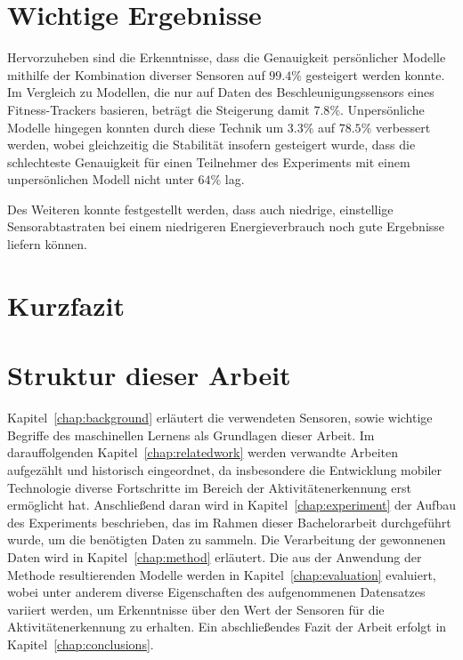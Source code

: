 \section{Wichtige Ergebnisse}
Hervorzuheben sind die Erkenntnisse, dass die Genauigkeit persönlicher Modelle mithilfe der Kombination diverser Sensoren auf $99.4 \%$ gesteigert werden konnte. Im Vergleich zu Modellen, die nur auf Daten des Beschleunigungssensors eines Fitness-Trackers basieren, beträgt die Steigerung damit $7.8 \%$. Unpersönliche Modelle hingegen konnten durch diese Technik um $3.3 \%$ auf $78.5 \%$ verbessert werden, wobei gleichzeitig die Stabilität insofern gesteigert wurde, dass die schlechteste Genauigkeit für einen Teilnehmer des Experiments mit einem unpersönlichen Modell nicht unter $64 \%$ lag.

Des Weiteren konnte festgestellt werden, dass auch niedrige, einstellige Sensorabtastraten bei einem niedrigeren Energieverbrauch noch gute Ergebnisse liefern können.

\section{Kurzfazit}

\section{Struktur dieser Arbeit}
Kapitel~\ref{chap:background} erläutert die verwendeten Sensoren, sowie wichtige Begriffe des maschinellen Lernens als Grundlagen dieser Arbeit. Im darauffolgenden Kapitel~\ref{chap:relatedwork} werden verwandte Arbeiten aufgezählt und historisch eingeordnet, da insbesondere die Entwicklung mobiler Technologie diverse Fortschritte im Bereich der Aktivitätenerkennung erst ermöglicht hat. Anschließend daran wird in Kapitel~\ref{chap:experiment} der Aufbau des Experiments beschrieben, das im Rahmen dieser Bachelorarbeit durchgeführt wurde, um die benötigten Daten zu sammeln. Die Verarbeitung der gewonnenen Daten wird in Kapitel~\ref{chap:method} erläutert. Die aus der Anwendung der Methode resultierenden Modelle werden in Kapitel~\ref{chap:evaluation} evaluiert, wobei unter anderem diverse Eigenschaften des aufgenommenen Datensatzes variiert werden, um Erkenntnisse über den Wert der Sensoren für die Aktivitätenerkennung zu erhalten. Ein abschließendes Fazit der Arbeit erfolgt in Kapitel~\ref{chap:conclusions}.


